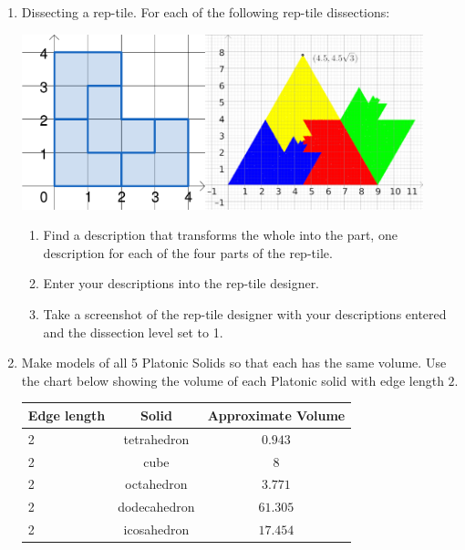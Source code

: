 \begin{enumerate}
\item Dissecting a rep-tile. For each of the following rep-tile dissections:
\begin{center}
    \includegraphics[height=2in]{images/rep-tiles-25}\hspace{.5in}\includegraphics[height=2in]{images/rep-tiles-30}
\end{center}
\begin{enumerate}
\item Find a description that transforms the whole into the part, one description for each of the four parts of the rep-tile.
\item Enter your descriptions into the rep-tile designer.
\item Take a screenshot of the rep-tile designer with your descriptions entered and the dissection level set to 1.
\end{enumerate}


\item Make models of all 5 Platonic Solids so that each has the same volume. Use the chart below showing the volume of each Platonic solid with edge length $2$. 

\begin{tabular}{| l | c| c|}
\hline
Edge length & Solid & Approximate Volume\\
\hline
2 & tetrahedron & $0.943$\\
\hline
2 & cube & $8$\\
\hline
2 & octahedron & $ 3.771$\\
\hline
2 & dodecahedron & $ 61.305$\\
\hline
2 & icosahedron & $17.454$\\
\hline
\end{tabular}


\end{enumerate}

